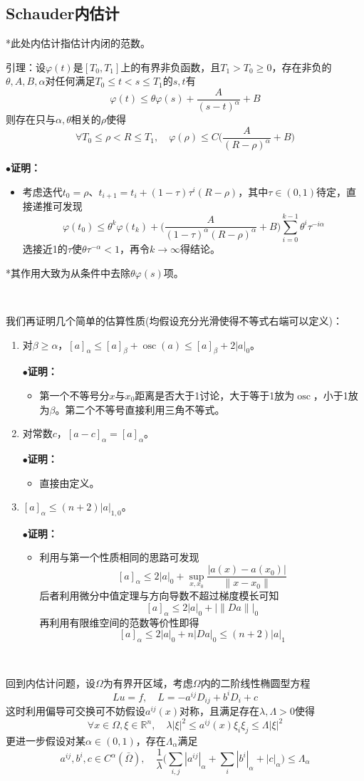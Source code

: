 \documentclass[a4paper,UTF8,fontset=windows,AutoFakeBold]{ctexart}
\DeclareMathOperator*{\osc}{osc}
\newcommand{\proo}[1]{{\kaishu $\bullet$\textbf{证明：}
\begin{itemize}
    \item[] #1
\end{itemize}
}}
\begin{document}
\subsection{Schauder内估计}
*此处内估计指估计内闭的范数。

引理：设$\varphi(t)$是$[T_0,T_1]$上的有界非负函数，且$T_1>T_0\ge0$，存在非负的$\theta,A,B,\alpha$对任何满足$T_0\le t<s\le T_1$的$s,t$有
$$\varphi(t)\le\theta\varphi(s)+\frac{A}{(s-t)^\alpha}+B$$
则存在只与$\alpha,\theta$相关的$\rho$使得
$$\forall T_0\le\rho<R\le T_1,\quad\varphi(\rho)\le C\bigg(\frac{A}{(R-\rho)^\alpha}+B\bigg)$$

\proo{
    考虑迭代$t_0=\rho$、$t_{i+1}=t_i+(1-\tau)\tau^i(R-\rho)$，其中$\tau\in(0,1)$待定，直接递推可发现
    $$\varphi(t_0)\le\theta^k\varphi(t_k)+\bigg(\frac{A}{(1-\tau)^\alpha(R-\rho)^\alpha}+B\bigg)\sum_{i=0}^{k-1}\theta^i\tau^{-i\alpha}$$
    选接近1的$\tau$使$\theta\tau^{-\alpha}<1$，再令$k\to\infty$得结论。
}

*其作用大致为从条件中去除$\theta\varphi(s)$项。

\

我们再证明几个简单的估算性质(均假设充分光滑使得不等式右端可以定义)：
\begin{enumerate}
    \item 对$\beta\ge\alpha$，$[a]_\alpha\le [a]_\beta+\osc(a)\le[a]_\beta+2|a|_0$。
    
    \proo{
        第一个不等号分$x$与$x_0$距离是否大于1讨论，大于等于1放为$\osc$，小于1放为$\beta$。第二个不等号直接利用三角不等式。
    }

    \item 对常数$c$，$[a-c]_\alpha=[a]_\alpha$。

    \proo{
        直接由定义。
    }

    \item $[a]_\alpha\le (n+2)|a|_{1,0}$。
    
    \proo{
        利用与第一个性质相同的思路可发现
        $$[a]_\alpha\le2|a|_0+\sup_{x,x_0}\frac{|a(x)-a(x_0)|}{\|x-x_0\|}$$
        后者利用微分中值定理与方向导数不超过梯度模长可知
        $$[a]_\alpha\le2|a|_0+|\|Da\||_0$$
        再利用有限维空间的范数等价性即得
        $$[a]_\alpha\le 2|a|_0+n|Da|_0\le(n+2)|a|_1$$
    }
\end{enumerate}

\

回到内估计问题，设$\Omega$为有界开区域，考虑$\Omega$内的二阶线性椭圆型方程
$$Lu=f,\quad L=-a^{ij}D_{ij}+b^iD_i+c$$
这时利用偏导可交换可不妨假设$a^{ij}(x)$对称，且满足存在$\lambda,\Lambda>0$使得
$$\forall x\in\Omega,\xi\in\mathbb{R}^n,\quad\lambda|\xi|^2\le a^{ij}(x)\xi_i\xi_j\le\Lambda|\xi|^2$$
更进一步假设对某$\alpha\in(0,1)$，存在$\Lambda_\alpha$满足
$$a^{ij},b^i,c\in C^\alpha(\bar\Omega),\quad\frac{1}{\lambda}\bigg(\sum_{i,j}|a^{ij}|_\alpha+\sum_i|b^i|_\alpha+|c|_\alpha\bigg)\le\Lambda_\alpha$$
\end{document}
